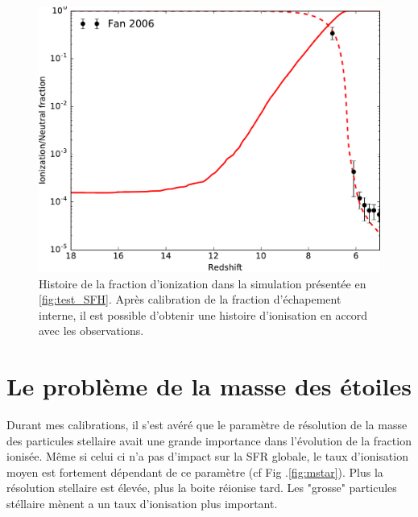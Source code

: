 \begin{figure}[bth]
        \includegraphics[width=.95\linewidth]{img/02/xion.pdf} 
        \caption{Histoire de la fraction d'ionization dans la simulation présentée en \ref{fig:test_SFH}.
        Après calibration de la fraction d'échapement interne, il est possible d'obtenir une histoire d'ionisation en accord avec les observations.
}
 		\label{fig:test_xion}
\end{figure}


\section{Le problème de la masse des étoiles}




Durant mes calibrations, il s'est avéré que le paramètre de résolution de la masse des particules stellaire avait une grande importance dans l'évolution de la fraction ionisée.
Même si celui ci n'a pas d'impact sur la SFR globale, le taux d'ionisation moyen est fortement dépendant de ce paramètre (cf Fig .\ref{fig:mstar}).
Plus la résolution stellaire est élevée, plus la boite réionise tard.
Les "grosse" particules stéllaire mènent a un taux d'ionisation plus important.


